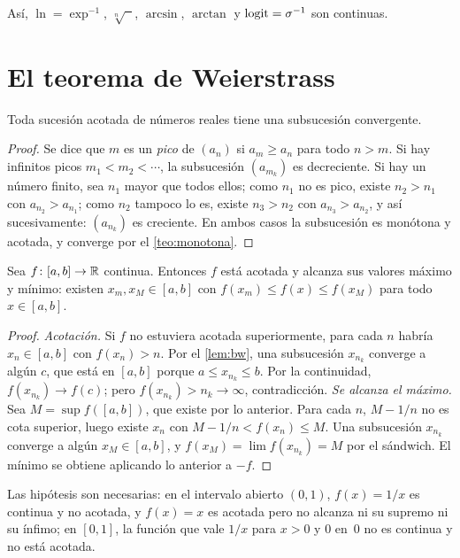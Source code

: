 Así, $\ln=\exp^{-1}$, $\sqrt[n]{\phantom{x}}$, $\arcsin$, $\arctan$ y $\operatorname{logit}=\sigma^{-1}$ son continuas.

\section{El teorema de Weierstrass}

\begin{lema}\label{lem:bw}
Toda sucesión acotada de números reales tiene una subsucesión convergente.
\end{lema}

\begin{proof}
Se dice que $m$ es un \emph{pico} de $(a_n)$ si $a_m\ge a_n$ para todo $n>m$. Si hay infinitos picos $m_1<m_2<\cdots$, la subsucesión $(a_{m_k})$ es decreciente. Si hay un número finito, sea $n_1$ mayor que todos ellos; como $n_1$ no es pico, existe $n_2>n_1$ con $a_{n_2}>a_{n_1}$; como $n_2$ tampoco lo es, existe $n_3>n_2$ con $a_{n_3}>a_{n_2}$, y así sucesivamente: $(a_{n_k})$ es creciente. En ambos casos la subsucesión es monótona y acotada, y converge por el \cref{teo:monotona}.
\end{proof}

\begin{teorema}[Weierstrass]\label{teo:weierstrass}
Sea $f\colon[a,b]\to\mathbb{R}$ continua. Entonces $f$ está acotada y alcanza sus valores máximo y mínimo: existen $x_m,x_M\in[a,b]$ con $f(x_m)\le f(x)\le f(x_M)$ para todo $x\in[a,b]$.
\end{teorema}

\begin{proof}
\emph{Acotación.} Si $f$ no estuviera acotada superiormente, para cada $n$ habría $x_n\in[a,b]$ con $f(x_n)>n$. Por el \cref{lem:bw}, una subsucesión $x_{n_k}$ converge a algún $c$, que está en $[a,b]$ porque $a\le x_{n_k}\le b$. Por la continuidad, $f(x_{n_k})\to f(c)$; pero $f(x_{n_k})>n_k\to\infty$, contradicción.
\emph{Se alcanza el máximo.} Sea $M=\sup f([a,b])$, que existe por lo anterior. Para cada $n$, $M-1/n$ no es cota superior, luego existe $x_n$ con $M-1/n<f(x_n)\le M$. Una subsucesión $x_{n_k}$ converge a algún $x_M\in[a,b]$, y $f(x_M)=\lim f(x_{n_k})=M$ por el sándwich. El mínimo se obtiene aplicando lo anterior a $-f$.
\end{proof}

Las hipótesis son necesarias: en el intervalo abierto $(0,1)$, $f(x)=1/x$ es continua y no acotada, y $f(x)=x$ es acotada pero no alcanza ni su supremo ni su ínfimo; en $[0,1]$, la función que vale $1/x$ para $x>0$ y $0$ en~$0$ no es continua y no está acotada.

